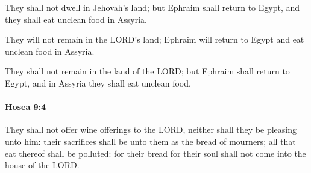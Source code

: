 			\begin{versebox}
					\item[BHS] 
					\item[LXX] 
					\item[ASV] They shall not dwell in Jehovah's land; but Ephraim shall return to Egypt, and they shall eat unclean food in Assyria.
					\item[NIV] They will not remain in the LORD’s land; Ephraim will return to Egypt and eat unclean food in Assyria.
					\item[NRSV] They shall not remain in the land of the LORD; but Ephraim shall return to Egypt, and in Assyria they shall eat unclean food.
			\end{versebox}

		\paragraph{Hosea 9:4} %
			\label{HOSEA-9-4}

			They shall not offer wine offerings to the LORD, neither shall they be pleasing unto him: their sacrifices shall be unto them as the bread of mourners; all that eat thereof shall be polluted: for their bread for their soul shall not come into the house of the LORD.

